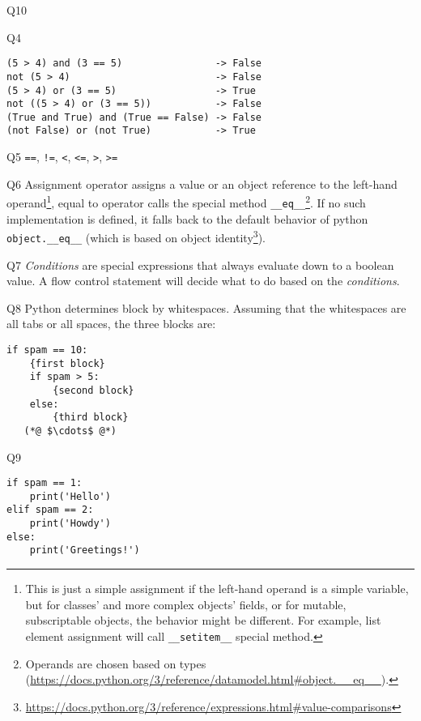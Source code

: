 \documentclass[a4paper,11pt]{scrartcl}
\begin{document}
\begin{labeling}{Q10}
  \item[Q4]
  \begin{lstlisting}
(5 > 4) and (3 == 5)                -> False
not (5 > 4)                         -> False
(5 > 4) or (3 == 5)                 -> True
not ((5 > 4) or (3 == 5))           -> False
(True and True) and (True == False) -> False
(not False) or (not True)           -> True
  \end{lstlisting}

  \item[Q5]
  \lstinline{==}, \lstinline{!=}, \lstinline{<}, \lstinline{<=}, \lstinline{>}, \lstinline{>=}

  \item[Q6]
  Assignment operator assigns a value or an object reference to the left-hand operand\footnote{This is just a simple assignment if the left-hand operand is a simple variable, but for classes' and more complex objects' fields, or for mutable, subscriptable objects, the behavior might be different. For example, list element assignment will call \lstinline|__setitem__| special method.}, equal to operator calls the special method \lstinline{__eq__}\footnote{Operands are chosen based on types (\url{https://docs.python.org/3/reference/datamodel.html\#object.__eq__}).}. If no such implementation is defined, it falls back to the default behavior of python \lstinline{object.__eq__} (which is based on object identity\footnote{\url{https://docs.python.org/3/reference/expressions.html\#value-comparisons}}).

  \item[Q7]
  \emph{Conditions} are special expressions that always evaluate down to a boolean value. A \linebreak flow control statement will decide what to do based on the \emph{conditions}.

  \item[Q8]
  Python determines block by whitespaces. Assuming that the whitespaces are all tabs or all spaces, the three blocks are:

  \begin{lstlisting}
if spam == 10:
    {first block}
    if spam > 5:
        {second block}
    else:
        {third block}
   (*@ $\cdots$ @*)
  \end{lstlisting}

  \item[Q9]
  \begin{lstlisting}
if spam == 1:
    print('Hello')
elif spam == 2:
    print('Howdy')
else:
    print('Greetings!')
  \end{lstlisting}


\end{labeling}
\end{document}
